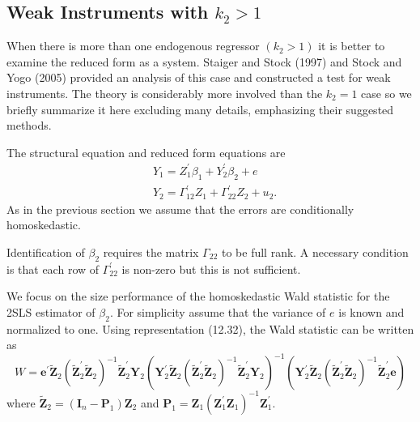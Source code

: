 \documentclass[10pt]{article}
\begin{document}
\subsection{Weak Instruments with $k_{2}>1$}
When there is more than one endogenous regressor $\left(k_{2}>1\right)$ it is better to examine the reduced form as a system. Staiger and Stock (1997) and Stock and Yogo (2005) provided an analysis of this case and constructed a test for weak instruments. The theory is considerably more involved than the $k_{2}=1$ case so we briefly summarize it here excluding many details, emphasizing their suggested methods.

The structural equation and reduced form equations are
$$
\begin{aligned}
&Y_{1}=Z_{1}^{\prime} \beta_{1}+Y_{2}^{\prime} \beta_{2}+e \\
&Y_{2}=\Gamma_{12}^{\prime} Z_{1}+\Gamma_{22}^{\prime} Z_{2}+u_{2} .
\end{aligned}
$$
As in the previous section we assume that the errors are conditionally homoskedastic.

Identification of $\beta_{2}$ requires the matrix $\Gamma_{22}$ to be full rank. A necessary condition is that each row of $\Gamma_{22}^{\prime}$ is non-zero but this is not sufficient.

We focus on the size performance of the homoskedastic Wald statistic for the 2SLS estimator of $\beta_{2}$. For simplicity assume that the variance of $e$ is known and normalized to one. Using representation (12.32), the Wald statistic can be written as
$$
W=\boldsymbol{e}^{\prime} \widetilde{\boldsymbol{Z}}_{2}\left(\widetilde{\boldsymbol{Z}}_{2}^{\prime} \widetilde{\boldsymbol{Z}}_{2}\right)^{-1} \widetilde{\boldsymbol{Z}}_{2}^{\prime} \boldsymbol{Y}_{2}\left(\boldsymbol{Y}_{2}^{\prime} \widetilde{\boldsymbol{Z}}_{2}\left(\widetilde{\boldsymbol{Z}}_{2}^{\prime} \widetilde{\boldsymbol{Z}}_{2}\right)^{-1} \widetilde{\boldsymbol{Z}}_{2}^{\prime} \boldsymbol{Y}_{2}\right)^{-1}\left(\boldsymbol{Y}_{2}^{\prime} \widetilde{\boldsymbol{Z}}_{2}\left(\widetilde{\boldsymbol{Z}}_{2}^{\prime} \widetilde{\boldsymbol{Z}}_{2}\right)^{-1} \widetilde{\boldsymbol{Z}}_{2}^{\prime} \boldsymbol{e}\right)
$$
where $\widetilde{\boldsymbol{Z}}_{2}=\left(\boldsymbol{I}_{n}-\boldsymbol{P}_{1}\right) \boldsymbol{Z}_{2}$ and $\boldsymbol{P}_{1}=\boldsymbol{Z}_{1}\left(\boldsymbol{Z}_{1}^{\prime} \boldsymbol{Z}_{1}\right)^{-1} \boldsymbol{Z}_{1}^{\prime}$.
\end{document}
